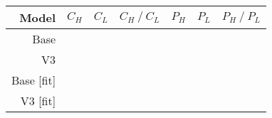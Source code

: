 \begin{tabularx}{0.7\linewidth}{r *{6}{Y}}
	\toprule
  Model & $C_H$ & $C_L$ & $C_H~/~C_L$ & $P_H$ & $P_L$ & $P_H~/~P_L$\\\midrule
  Base &
    
  & 
  & 
  & 
  & 
  & \textbf{}\\
  V3 &
    
  & 
  & 
  & 
  & 
  & \textbf{}\\
  Base [fit] &
    
  & 
  & \textbf{}
  & 
  & 
  & \\
  V3 [fit] &
    
  & 
  & \textbf{}
  & 
  & 
  & \\
  \bottomrule
\end{tabularx}
